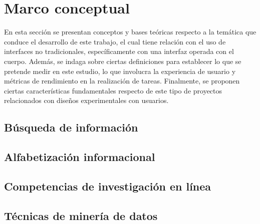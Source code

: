 \section{Marco conceptual}
\label{sec:marco_conceptual}
En esta sección se presentan conceptos y bases teóricas respecto a la temática que conduce el desarrollo de este trabajo, el cual tiene relación con el uso de interfaces no tradicionales, específicamente con una interfaz operada con el cuerpo. Además, se indaga sobre ciertas definiciones para establecer lo que se pretende medir en este estudio, lo que involucra la experiencia de usuario y métricas de rendimiento en la realización de tareas. Finalmente, se proponen ciertas características fundamentales respecto de este tipo de proyectos relacionados con diseños experimentales con usuarios.

\subsection{Búsqueda de información}
\label{subsec:busqueda}

\subsection{Alfabetización informacional}
\label{subsec:alfabetizacion}


\subsection{Competencias de investigación en línea}
\label{subsec:competencias}

\subsection{Técnicas de minería de datos}
\label{subsec:mineria}